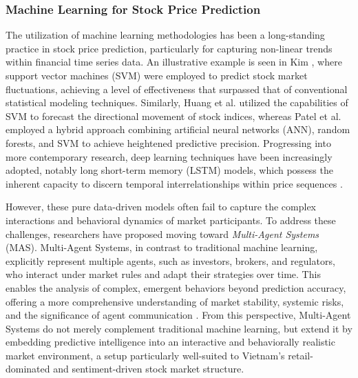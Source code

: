\documentclass{ieeeaccess}
\begin{document}
\subsubsection{Machine Learning for Stock Price Prediction}
The utilization of machine learning methodologies has been a long-standing practice in stock price prediction, particularly for capturing non-linear trends within financial time series data. An illustrative example is seen in Kim \cite{kim2003}, where support vector machines (SVM) were employed to predict stock market fluctuations, achieving a level of effectiveness that surpassed that of conventional statistical modeling techniques. Similarly, Huang et al. \cite{huang2005} utilized the capabilities of SVM to forecast the directional movement of stock indices, whereas Patel et al. \cite{patel2015} employed a hybrid approach combining artificial neural networks (ANN), random forests, and SVM to achieve heightened predictive precision. Progressing into more contemporary research, deep learning techniques have been increasingly adopted, notably long short-term memory (LSTM) models, which possess the inherent capacity to discern temporal interrelationships within price sequences \cite{fischer2018,chen2015}.

However, these pure data-driven models often fail to capture the complex interactions and behavioral dynamics of market participants. To address these challenges, researchers have proposed moving toward \textit{Multi-Agent Systems} (MAS). Multi-Agent Systems, in contrast to traditional machine learning, explicitly represent multiple agents, such as investors, brokers, and regulators, who interact under market rules and adapt their strategies over time. This enables the analysis of complex, emergent behaviors beyond prediction accuracy, offering a more comprehensive understanding of market stability, systemic risks, and the significance of agent communication \cite{lebaron2006,chen2012,tesfatsion2006,wang2021}. From this perspective, Multi-Agent Systems do not merely complement traditional machine learning, but extend it by embedding predictive intelligence into an interactive and behaviorally realistic market environment, a setup particularly well-suited to Vietnam’s retail-dominated and sentiment-driven stock market structure.
\end{document}
